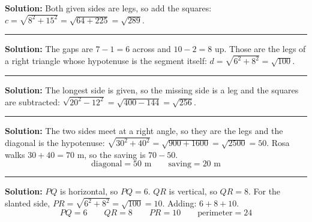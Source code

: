 \documentclass[12pt]{article}
\begin{document}



\textbf{Solution:} \quad Both given sides are legs, so add the squares:
$c = \sqrt{8^2 + 15^2} = \sqrt{64 + 225} = \sqrt{289}$. 

\vspace{0.2cm}

\noindent\rule{\linewidth}{0.2pt}


\textbf{Solution:} \quad The gaps are $7 - 1 = 6$ across and $10 - 2 = 8$ up. Those are the legs
of a right triangle whose hypotenuse is the segment itself:
$d = \sqrt{6^2 + 8^2} = \sqrt{100}$. 

\vspace{0.2cm}

\noindent\rule{\linewidth}{0.2pt}


\textbf{Solution:} \quad The longest side is given, so the missing side is a leg and the squares
are subtracted: $\sqrt{20^2 - 12^2} = \sqrt{400 - 144} = \sqrt{256}$. 

\vspace{0.2cm}

\noindent\rule{\linewidth}{0.2pt}


\textbf{Solution:} \quad The two sides meet at a right angle, so they are the legs and the
diagonal is the hypotenuse: $\sqrt{30^2 + 40^2} = \sqrt{900 + 1600} = \sqrt{2500} = 50$. Rosa
walks $30 + 40 = 70$ m, so the saving is $70 - 50$.
\[ \boxed{\text{diagonal} = 50 \text{ m} \qquad \text{saving} = 20 \text{ m}} \]

\vspace{0.2cm}

\noindent\rule{\linewidth}{0.2pt}


\textbf{Solution:} \quad $PQ$ is horizontal, so $PQ = 6$. $QR$ is vertical, so $QR = 8$. For the
slanted side, $PR = \sqrt{6^2 + 8^2} = \sqrt{100} = 10$. Adding: $6 + 8 + 10$.
\[ \boxed{PQ = 6 \qquad QR = 8 \qquad PR = 10 \qquad \text{perimeter} = 24} \]
\end{document}
